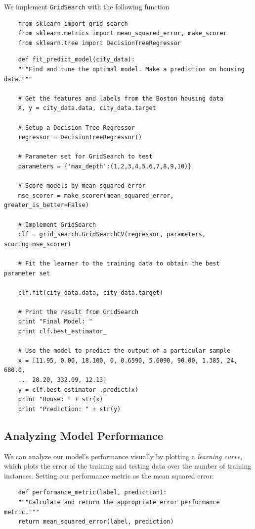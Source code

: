 \documentclass[12 pt]{article}
\numberwithin{equation}{section}
\begin{document}
We implement \texttt{GridSearch} with the following function 
\begin{verbatim}
	from sklearn import grid_search
	from sklearn.metrics import mean_squared_error, make_scorer
	from sklearn.tree import DecisionTreeRegressor
\end{verbatim}
\begin{verbatim}
	def fit_predict_model(city_data):
    """Find and tune the optimal model. Make a prediction on housing data."""

    # Get the features and labels from the Boston housing data
    X, y = city_data.data, city_data.target

    # Setup a Decision Tree Regressor
    regressor = DecisionTreeRegressor()
	
	# Parameter set for GridSearch to test 
    parameters = {'max_depth':(1,2,3,4,5,6,7,8,9,10)}
    
    # Score models by mean squared error
    mse_scorer = make_scorer(mean_squared_error, greater_is_better=False)
    
    # Implement GridSearch
    clf = grid_search.GridSearchCV(regressor, parameters, scoring=mse_scorer)
    
    # Fit the learner to the training data to obtain the best parameter set
   
    clf.fit(city_data.data, city_data.target)
    
    # Print the result from GridSearch
    print "Final Model: "
    print clf.best_estimator_
    
    # Use the model to predict the output of a particular sample
    x = [11.95, 0.00, 18.100, 0, 0.6590, 5.6090, 90.00, 1.385, 24, 680.0, 
    ... 20.20, 332.09, 12.13]
    y = clf.best_estimator_.predict(x)
    print "House: " + str(x)
    print "Prediction: " + str(y)
\end{verbatim}

\subsection{Analyzing Model Performance}
We can analyze our model's performance visually by plotting a \emph{learning curve}, which plots the error of the training and testing data over the number of training instances. Setting our performance metric as the mean squared error:

\begin{verbatim}
	def performance_metric(label, prediction):
    """Calculate and return the appropriate error performance metric."""
    return mean_squared_error(label, prediction)
\end{verbatim}
\end{document}
